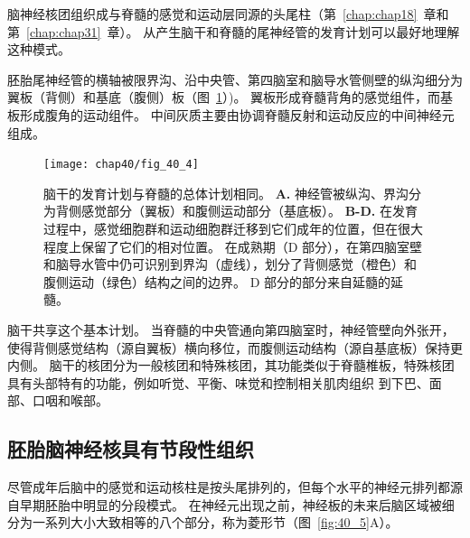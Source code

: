 脑神经核团组织成与脊髓的感觉和运动层同源的头尾柱（第~\ref{chap:chap18}~章和第~\ref{chap:chap31}~章）。
从产生脑干和脊髓的尾神经管的发育计划可以最好地理解这种模式。


胚胎尾神经管的横轴被限界沟、沿中央管、第四脑室和脑导水管侧壁的纵沟细分为翼板（背侧）和基底（腹侧）板（图~\ref{fig:40_4}）)。
翼板形成脊髓背角的感觉组件，而基板形成腹角的运动组件。
中间灰质主要由协调脊髓反射和运动反应的中间神经元组成。


\begin{figure}[htbp]
	\centering
	\texttt{[image: chap40/fig\_40\_4]}
	\caption{脑干的发育计划与脊髓的总体计划相同。
		\textbf{A.} 神经管被纵沟、界沟分为背侧感觉部分（翼板）和腹侧运动部分（基底板）。
		\textbf{B-D.} 在发育过程中，感觉细胞群和运动细胞群迁移到它们成年的位置，但在很大程度上保留了它们的相对位置。
		在成熟期（D 部分），在第四脑室壁和脑导水管中仍可识别到界沟（虚线），划分了背侧感觉（橙色）和腹侧运动（绿色）结构之间的边界。
		D 部分的部分来自延髓的延髓。}
	\label{fig:40_4}
\end{figure}


脑干共享这个基本计划。
当脊髓的中央管通向第四脑室时，神经管壁向外张开，使得背侧感觉结构（源自翼板）横向移位，而腹侧运动结构（源自基底板）保持更内侧。
脑干的核团分为一般核团和特殊核团，其功能类似于脊髓椎板，特殊核团具有头部特有的功能，例如听觉、平衡、味觉和控制相关肌肉组织 到下巴、面部、口咽和喉部。



\subsection{胚胎脑神经核具有节段性组织}

尽管成年后脑中的感觉和运动核柱是按头尾排列的，但每个水平的神经元排列都源自早期胚胎中明显的分段模式。 
在神经元出现之前，神经板的未来后脑区域被细分为一系列大小大致相等的八个部分，称为菱形节（图~\ref{fig:40_5}A）。



